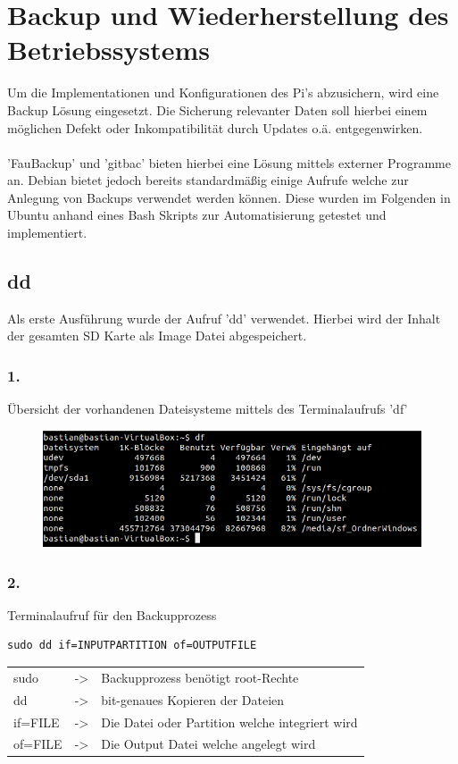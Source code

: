 \section{Backup und Wiederherstellung des Betriebssystems}

Um die Implementationen und Konfigurationen des Pi's abzusichern, wird eine Backup Lösung eingesetzt. Die Sicherung relevanter Daten soll hierbei einem möglichen Defekt oder Inkompatibilität durch Updates o.ä. entgegenwirken.\\
\\
'FauBackup' und 'gitbac' bieten hierbei eine Lösung mittels externer Programme an. Debian bietet jedoch bereits standardmäßig einige Aufrufe welche zur Anlegung von Backups verwendet werden können. Diese wurden im Folgenden in Ubuntu anhand eines Bash Skripts zur Automatisierung getestet und implementiert.\\

\subsection{dd}
Als erste Ausführung wurde der Aufruf 'dd' verwendet. Hierbei wird der Inhalt der gesamten SD Karte als Image Datei abgespeichert.\\

\subsubsection*{1.}
Übersicht der vorhandenen Dateisysteme mittels des Terminalaufrufs 'df'\\
\begin{figure}[ht]
\includegraphics[width=.8\textwidth]{pictures/Bastian/BILD1_df}
\end{figure}

\subsubsection*{2.}
Terminalaufruf für den Backupprozess
\lstset{language=bash,numbers=none,frame=single}
\begin{lstlisting}
sudo dd if=INPUTPARTITION of=OUTPUTFILE
\end{lstlisting}
\begin{tabular}{l c l}
sudo	& -> & Backupprozess benötigt root-Rechte\\
dd	& -> & bit-genaues Kopieren der Dateien\\
if=FILE	& -> & Die Datei oder Partition welche integriert wird\\
of=FILE & -> & Die Output Datei welche angelegt wird\\
\end{tabular}
\newpage %

